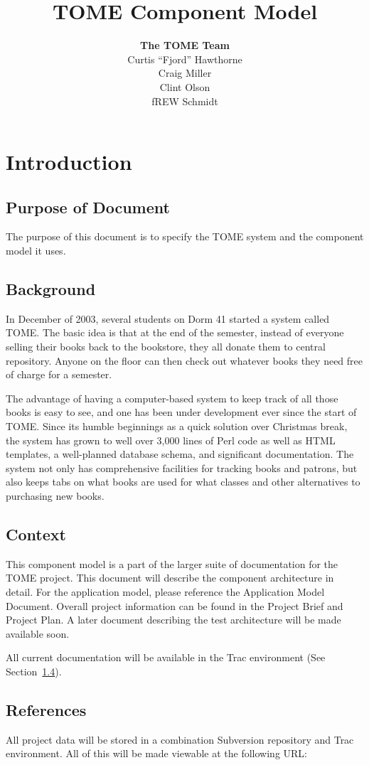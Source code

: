 \documentclass[12pt,titlepage]{article}
\author{\textbf{The TOME Team}\\
Curtis ``Fjord'' Hawthorne \\
Craig Miller\\
Clint Olson\\
fREW Schmidt
}
\title{\textbf{TOME Component Model}}
\begin{document}
\maketitle
\tableofcontents
\listoffigures
\newpage
\section{Introduction}
\subsection{Purpose of Document}
The purpose of this document is to specify the TOME system and the component model it uses.

\subsection{Background}
In December of 2003, several students on Dorm 41 started a system called TOME.  The basic idea is that at the end of the semester, instead of everyone selling their books back to the bookstore, they all donate them to central repository.  Anyone on the floor can then check out whatever books they need free of charge for a semester.

The advantage of having a computer-based system to keep track of all those books is easy to see, and one has been under development ever since the start of TOME.  Since its humble beginnings as a quick solution over Christmas break, the system has grown to well over 3,000 lines of Perl code as well as HTML templates, a well-planned database schema, and significant documentation.  The system not only has comprehensive facilities for tracking books and patrons, but also keeps tabs on what books are used for what classes and other alternatives to purchasing new books.
\subsection{Context}
This component model is a part of the larger suite of documentation for the TOME project.  This document will describe the component architecture in detail.  For the application model, please reference the Application Model Document.  Overall project information can be found in the Project Brief and Project Plan.  A later document describing the test architecture will be made available soon.

All current documentation will be available in the Trac environment (See Section~\ref{references}).
\subsection{References}
\label{references}
All project data will be stored in a combination Subversion repository and Trac environment.  All of this will be made viewable at the following URL:
\end{document}
